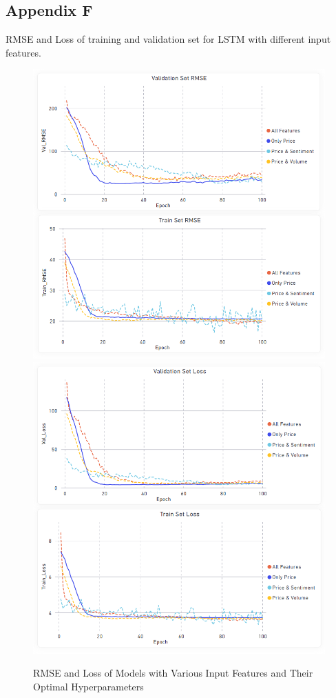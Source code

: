 \documentclass[11pt, a4paper]{article}
\begin{document}
\subsection{Appendix F}
\label{appendix:lstm_models_rmse_loss}
RMSE and Loss of training and validation set for LSTM with different input features.
\begin{figure}[!hb]
    \centering
    \includegraphics[scale = 0.4]{Best_Params_Of_Model_RMSE.png}
    \includegraphics[scale = 0.4]{Best_Params_Of_Model_Loss.png}
    \caption{RMSE and Loss of Models with Various Input Features and Their Optimal Hyperparameters}
    \label{fig:lstm_models_rmse_loss}
\end{figure}
\end{document}
